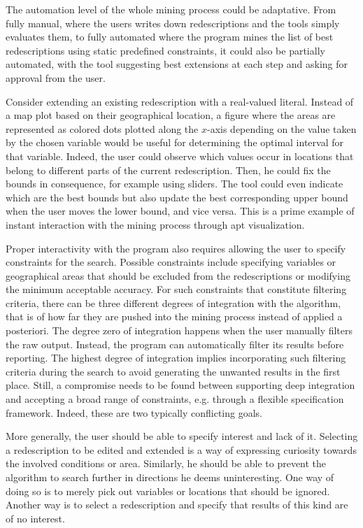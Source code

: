 The automation level of the whole mining process could be adaptative.
From fully manual, where the users writes down redescriptions and the
tools simply evaluates them, to fully automated where the program
mines the list of best redescriptions using static predefined
constraints, it could also be partially automated, with the tool
suggesting best extensions at each step and asking for approval from
the user.

Consider extending an existing redescription with a real-valued
literal. Instead of a map plot based on their geographical location, a
figure where the areas are represented as colored dots plotted along
the $x$-axis depending on the value taken by the chosen variable would be
useful for determining the optimal interval for that variable. Indeed,
the user could observe which values occur in locations that belong to
different parts of the current redescription. Then, he could fix the
bounds in consequence, for example using sliders.  The tool could even
indicate which are the best bounds but also update the best
corresponding upper bound when the user moves the lower bound, and
vice versa. This is a prime example of instant interaction with the
mining process through apt visualization.  

Proper interactivity with the program also requires allowing the user
to specify constraints for the search. Possible constraints include
specifying variables or geographical areas that should be excluded
from the redescriptions or modifying the minimum acceptable accuracy.
For such constraints that constitute filtering criteria, there can be
three different degrees of integration with the algorithm, that is of
how far they are pushed into the mining process instead of applied a
posteriori.  The degree zero of integration happens when the user
manually filters the raw output. Instead, the program can
automatically filter its results before reporting. The highest degree
of integration implies incorporating such filtering criteria during
the search to avoid generating the unwanted results in the first
place.  Still, a compromise needs to be found between supporting
deep integration and accepting a broad range of constraints,
e.g. through a flexible specification framework. Indeed, these are two
 typically conflicting goals.

 More generally, the user should be able to specify interest and lack
 of it. Selecting a redescription to be edited and extended is a way
 of expressing curiosity towards the involved conditions or
 area. Similarly, he should be able to prevent the algorithm to search
 further in directions he deems uninteresting.  One way of doing so is
 to merely pick out variables or locations that should be ignored.
 Another way is to select a redescription and specify that results of
 this kind are of no interest. 


